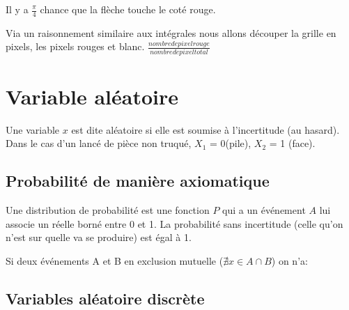 \begin{multicols}{2}
[]
\vspace{0.10cm}
Il y a $\frac{\pi}{4}$ chance que la flèche touche le coté rouge.
\end{multicols}

\begin{multicols}{2}
[]
\vspace{0.1cm}
Via un raisonnement similaire aux intégrales nous allons découper la grille en pixels, les pixels rouges et blanc.
$\frac{nombre de pixel rouge}{nombre de pixel total}$
\end{multicols}

\section{Variable aléatoire}

Une variable $x$ est dite aléatoire si elle est soumise à l'incertitude (au hasard).\\
Dans le cas d'un lancé de pièce non truqué, $X_1$ = 0(pile), $X_2$ = 1 (face).\\

\subsection{Probabilité de manière axiomatique}

Une distribution de probabilité est une fonction $P$ qui a un événement $A$ lui associe un réelle borné entre 0 et 1.
La probabilité sans incertitude (celle qu'on n'est sur quelle va se produire) est égal à 1.\\

Si deux événements A et B en exclusion mutuelle ($\nexists x \in A \cap B$) on n'a:

\subsection{Variables aléatoire discrète}

